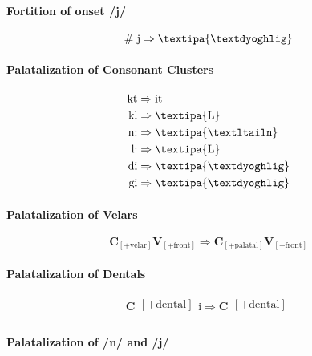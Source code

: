 \documentclass{report}
\begin{document}
\paragraph{Fortition of onset /j/}

\begin{equation}
  \#\ \text{j} \Rightarrow \text{\textipa{\textdyoghlig}}
\end{equation}

\paragraph{Palatalization of Consonant Clusters}

\begin{align}
  \text{kt} & \Rightarrow \text{it} \\
  \text{kl} & \Rightarrow \text{\textipa{L}} \\
  \text{n:} & \Rightarrow \text{\textipa{\textltailn}} \\
  \text{l:} & \Rightarrow \text{\textipa{L}} \\
  \text{di} & \Rightarrow \text{\textipa{\textdyoghlig}} \\
  \text{gi} & \Rightarrow \text{\textipa{\textdyoghlig}}
\end{align}

\paragraph{Palatalization of Velars}

\begin{equation}
  \textbf{C}_{[+\text{velar}]}\textbf{V}_{[+\text{front}]} \Rightarrow \textbf{C}_{[+\text{palatal}]}\textbf{V}_{[+\text{front}]}
\end{equation}


\paragraph{Palatalization of Dentals}

\begin{equation}
  \textbf{C}\substack{[+\text{dental}] \\ [+\text{stop}]}\text{i} \Rightarrow \textbf{C}\substack{[+\text{dental}] \\ [+\text{affricate}]}
\end{equation}

\paragraph{Palatalization of /n/ and /j/}
\end{document}

